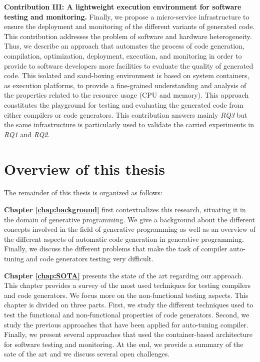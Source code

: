\textbf{Contribution III: A lightweight execution environment for software testing and monitoring.}
Finally, we propose a micro-service infrastructure to ensure the deployment and monitoring of the different variants of generated code. This contribution addresses the problem of software and hardware heterogeneity. Thus, we describe an approach that automates the process of code generation, compilation, optimization, deployment, execution, and monitoring in order to provide to software developers more facilities to evaluate the quality of generated code. 
This isolated and sand-boxing environment is based on system containers, as execution platforms, to provide a fine-grained understanding and analysis of the properties related to the resource usage (CPU and memory). 
This approach constitutes the playground for testing and evaluating the generated code from either compilers or code generators. This contribution answers mainly \textit{RQ3} but the same infrastructure is particularly used to validate the carried experiments in \textit{RQ1} and \textit{RQ2}.

\section{Overview of this thesis}
The remainder of this thesis is organized  as follows:

\textbf{Chapter \ref{chap:background}} first contextualizes this research, situating it in the domain of generative programming. We give a background about the different concepts involved in the field of generative programming as well as an overview of the different aspects of automatic code generation in generative programming. Finally, we discuss the different problems that make the task of compiler auto-tuning and code generators testing very difficult.

\textbf{Chapter \ref{chap:SOTA}} presents the state of the art regarding our approach. This chapter provides a survey of the most used techniques for testing compilers and code generators. We focus more on the non-functional testing aspects.
This chapter is divided on three parts. First, we study the different techniques used to test the functional and non-functional properties of code generators. Second, we study the previous approaches that have been applied for auto-tuning compiler. Finally, we present several approaches that used the container-based architecture for software testing and monitoring. At the end, we provide a summary of the sate of the art and we discuss several open challenges.


